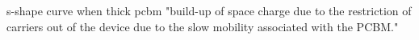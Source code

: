 %

s-shape curve when thick pcbm \cite{Wheeler2017} "build-up of space charge due to the restriction of carriers out of the device due to the slow mobility associated with the PCBM."


